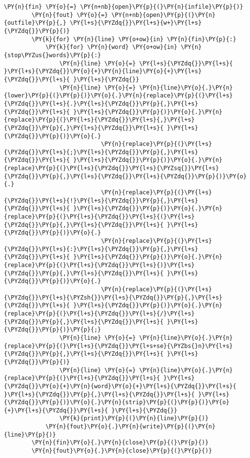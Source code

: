 \begin{Verbatim}[frame=single,commandchars=\\\{\}]
        \PY{n}{fin} \PY{o}{=} \PY{n+nb}{open}\PY{p}{(}\PY{n}{infile}\PY{p}{)}
        \PY{n}{fout} \PY{o}{=} \PY{n+nb}{open}\PY{p}{(}\PY{n}{outfile}\PY{p}{,} \PY{l+s}{\PYZdq{}}\PY{l+s}{w+}\PY{l+s}{\PYZdq{}}\PY{p}{)}
        \PY{k}{for} \PY{n}{line} \PY{o+ow}{in} \PY{n}{fin}\PY{p}{:}
            \PY{k}{for} \PY{n}{word} \PY{o+ow}{in} \PY{n}{stop\PYZus{}words}\PY{p}{:}
                \PY{n}{line} \PY{o}{=} \PY{l+s}{\PYZdq{}}\PY{l+s}{ }\PY{l+s}{\PYZdq{}}\PY{o}{+}\PY{n}{line}\PY{o}{+}\PY{l+s}{\PYZdq{}}\PY{l+s}{ }\PY{l+s}{\PYZdq{}}
                \PY{n}{line} \PY{o}{=} \PY{n}{line}\PY{o}{.}\PY{n}{lower}\PY{p}{(}\PY{p}{)}\PY{o}{.}\PY{n}{replace}\PY{p}{(}\PY{l+s}{\PYZdq{}}\PY{l+s}{.}\PY{l+s}{\PYZdq{}}\PY{p}{,}\PY{l+s}{\PYZdq{}}\PY{l+s}{ }\PY{l+s}{\PYZdq{}}\PY{p}{)}\PY{o}{.}\PY{n}{replace}\PY{p}{(}\PY{l+s}{\PYZdq{}}\PY{l+s}{,}\PY{l+s}{\PYZdq{}}\PY{p}{,}\PY{l+s}{\PYZdq{}}\PY{l+s}{ }\PY{l+s}{\PYZdq{}}\PY{p}{)}\PY{o}{.}
                            \PY{n}{replace}\PY{p}{(}\PY{l+s}{\PYZdq{}}\PY{l+s}{;}\PY{l+s}{\PYZdq{}}\PY{p}{,}\PY{l+s}{\PYZdq{}}\PY{l+s}{ }\PY{l+s}{\PYZdq{}}\PY{p}{)}\PY{o}{.}\PY{n}{replace}\PY{p}{(}\PY{l+s}{\PYZdq{}}\PY{l+s}{\PYZsq{}}\PY{l+s}{\PYZdq{}}\PY{p}{,}\PY{l+s}{\PYZdq{}}\PY{l+s}{\PYZdq{}}\PY{p}{)}\PY{o}{.}
                            \PY{n}{replace}\PY{p}{(}\PY{l+s}{\PYZdq{}}\PY{l+s}{!}\PY{l+s}{\PYZdq{}}\PY{p}{,}\PY{l+s}{\PYZdq{}}\PY{l+s}{ }\PY{l+s}{\PYZdq{}}\PY{p}{)}\PY{o}{.}\PY{n}{replace}\PY{p}{(}\PY{l+s}{\PYZdq{}}\PY{l+s}{(}\PY{l+s}{\PYZdq{}}\PY{p}{,}\PY{l+s}{\PYZdq{}}\PY{l+s}{ }\PY{l+s}{\PYZdq{}}\PY{p}{)}\PY{o}{.}
                            \PY{n}{replace}\PY{p}{(}\PY{l+s}{\PYZdq{}}\PY{l+s}{:}\PY{l+s}{\PYZdq{}}\PY{p}{,}\PY{l+s}{\PYZdq{}}\PY{l+s}{ }\PY{l+s}{\PYZdq{}}\PY{p}{)}\PY{o}{.}\PY{n}{replace}\PY{p}{(}\PY{l+s}{\PYZdq{}}\PY{l+s}{)}\PY{l+s}{\PYZdq{}}\PY{p}{,}\PY{l+s}{\PYZdq{}}\PY{l+s}{ }\PY{l+s}{\PYZdq{}}\PY{p}{)}\PY{o}{.}
                            \PY{n}{replace}\PY{p}{(}\PY{l+s}{\PYZdq{}}\PY{l+s}{\PYZsh{}}\PY{l+s}{\PYZdq{}}\PY{p}{,}\PY{l+s}{\PYZdq{}}\PY{l+s}{ }\PY{l+s}{\PYZdq{}}\PY{p}{)}\PY{o}{.}\PY{n}{replace}\PY{p}{(}\PY{l+s}{\PYZdq{}}\PY{l+s}{/}\PY{l+s}{\PYZdq{}}\PY{p}{,}\PY{l+s}{\PYZdq{}}\PY{l+s}{ }\PY{l+s}{\PYZdq{}}\PY{p}{)}\PY{p}{;}
                \PY{n}{line} \PY{o}{=} \PY{n}{line}\PY{o}{.}\PY{n}{replace}\PY{p}{(}\PY{l+s}{\PYZdq{}}\PY{l+s+se}{\PYZbs{}n}\PY{l+s}{\PYZdq{}}\PY{p}{,}\PY{l+s}{\PYZdq{}}\PY{l+s}{ }\PY{l+s}{\PYZdq{}}\PY{p}{)}
                \PY{n}{line} \PY{o}{=} \PY{n}{line}\PY{o}{.}\PY{n}{replace}\PY{p}{(}\PY{l+s}{\PYZdq{}}\PY{l+s}{ }\PY{l+s}{\PYZdq{}}\PY{o}{+}\PY{n}{word}\PY{o}{+}\PY{l+s}{\PYZdq{}}\PY{l+s}{ }\PY{l+s}{\PYZdq{}}\PY{p}{,}\PY{l+s}{\PYZdq{}}\PY{l+s}{ }\PY{l+s}{\PYZdq{}}\PY{p}{)}\PY{o}{.}\PY{n}{strip}\PY{p}{(}\PY{p}{)}\PY{o}{+}\PY{l+s}{\PYZdq{}}\PY{l+s}{ }\PY{l+s}{\PYZdq{}}
                \PY{k}{print}\PY{p}{(}\PY{n}{line}\PY{p}{)}
            \PY{n}{fout}\PY{o}{.}\PY{n}{write}\PY{p}{(}\PY{n}{line}\PY{p}{)}
        \PY{n}{fin}\PY{o}{.}\PY{n}{close}\PY{p}{(}\PY{p}{)}
        \PY{n}{fout}\PY{o}{.}\PY{n}{close}\PY{p}{(}\PY{p}{)}


\end{Verbatim}
